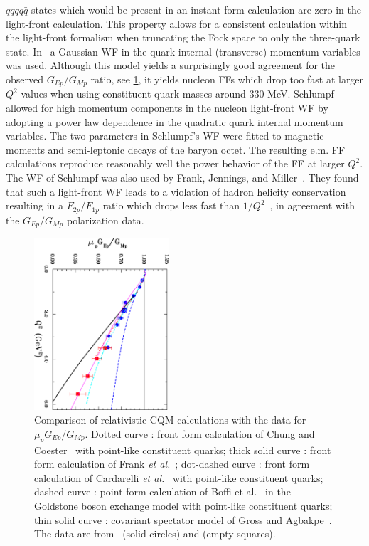 $qqqq \bar q$ states which would be present in an instant form calculation 
are zero in the light-front calculation. 
This property allows for a consistent calculation within 
the light-front formalism when truncating the Fock space to only the 
three-quark state. 
\newline
\indent
In~\cite{chung} a Gaussian WF in the quark internal 
(transverse) momentum variables was used. Although this model yields a 
surprisingly good agreement for the observed $G_{Ep}/G_{Mp}$ ratio, 
see \ref{relcqm}, it yields nucleon FFs which 
drop too fast at larger $Q^2$ values when using constituent quark masses 
around 330 MeV.  
Schlumpf~\cite{schlumpf} allowed for high momentum components in the 
nucleon light-front WF by adopting 
a power law dependence in the 
quadratic quark internal momentum variables. The two parameters in Schlumpf's  
WF were fitted to magnetic moments and semi-leptonic decays of the 
baryon octet. The resulting e.m. FF calculations reproduce reasonably well 
the power behavior of the FF at larger $Q^2$. 
The WF of Schlumpf was also used 
by Frank, Jennings, and Miller~\cite{gamiller,miller02}. 
They found that such a light-front WF leads to a violation of 
hadron helicity conservation resulting in a  
$F_{2p}/F_{1p}$ ratio which drops less fast than 
$1/Q^2$~\cite{miller02}, in agreement with the $G_{Ep}/G_{Mp}$ polarization 
data.    

\begin{figure}[h]
\begin{center}
\includegraphics[width =5cm,angle=90]{gepgmp_jlab_vsCQM_col.pdf}
\end{center}
\vspace{-0.25cm}
\caption{\small Comparison of relativistic CQM calculations 
with the data for $\mu_p G_{Ep} / G_{Mp}$. 
Dotted curve : front form calculation of Chung and Coester~\cite{chung} 
with point-like constituent quarks; 
thick solid curve : front form calculation of Frank {\it et al.}~\cite{gamiller}; 
dot-dashed curve : front form calculation of 
Cardarelli {\it et al.}~\cite{rome,cardarelli} with point-like constituent quarks; 
dashed curve : point form calculation of Boffi et 
al.~\cite{boffi} in the Goldstone boson exchange model with point-like 
constituent quarks; 
thin solid curve : covariant spectator model of 
Gross and Agbakpe~\cite{gross}. 
The data are from~\cite{punjabi05} (solid circles) and  
\cite{gayou2} (empty squares). 
}
\label{relcqm}
\end{figure}

